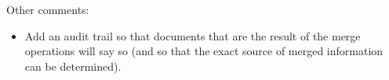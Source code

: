 Other comments:

\begin{itemize}
\item Add an audit trail so that documents that are the result of the merge
  operations will say so (and so that the exact source of merged
  information can be determined).
\end{itemize}
  

%
%
%
%

